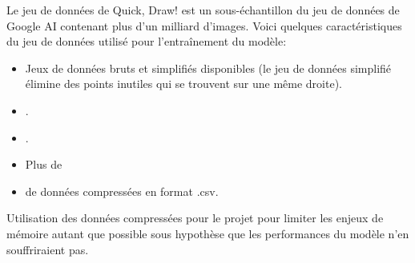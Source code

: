 Le jeu de données de Quick, Draw! est un sous-échantillon du jeu de données de Google AI contenant plus d'un milliard d'images. Voici quelques caractéristiques du jeu de données utilisé pour l'entraînement du modèle:

\begin{itemize}
	\item Jeux de données bruts et simplifiés disponibles (le jeu de données simplifié élimine des points inutiles qui se trouvent sur une même droite).
	\item {}.
	\item {}.
	\item Plus de 
	\item {} de données compressées en format .csv.
\end{itemize}

Utilisation des données compressées pour le projet pour limiter les enjeux de mémoire autant que possible sous hypothèse que les performances du modèle n'en souffriraient pas.

\vspace{-.5mm}